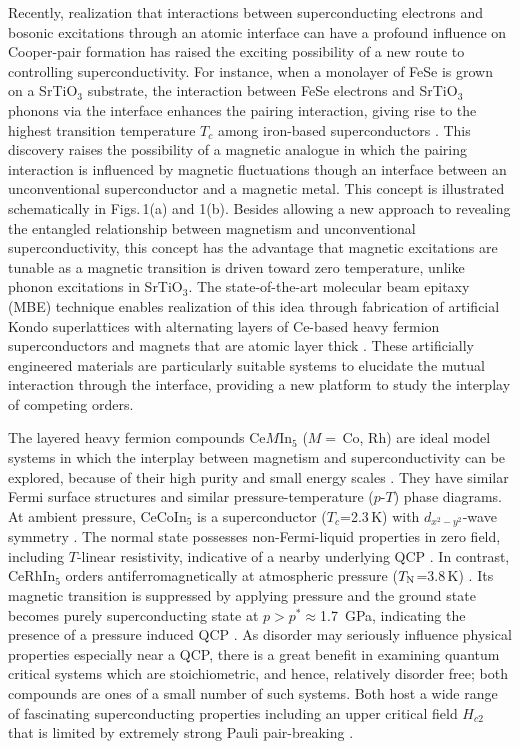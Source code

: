 \documentclass[twocolumn,preprintnumbers,amsmath,amssymb,prl]{revtex4}
\begin{document}
Recently, realization that interactions between superconducting electrons and bosonic excitations through an atomic interface can have a profound influence on Cooper-pair formation has raised the exciting possibility of a new route to controlling superconductivity.   For instance, when a monolayer of FeSe is grown on a SrTiO$_3$ substrate, the interaction between FeSe electrons and SrTiO$_3$ phonons via the interface enhances the pairing interaction, giving rise to the highest  transition temperature $T_c$ among iron-based superconductors \cite{Huang,DHLee,JJLee,Rademaker}.    This discovery raises the possibility of a magnetic analogue in which the pairing interaction is influenced by magnetic fluctuations though an interface between  an unconventional superconductor and a magnetic metal. This concept is illustrated schematically in Figs.\,1(a) and 1(b). Besides allowing a new approach to revealing the entangled relationship between magnetism and unconventional superconductivity, this concept has the  advantage that magnetic excitations are tunable as a magnetic transition is driven toward zero temperature, unlike phonon excitations in SrTiO$_3$.  The state-of-the-art molecular beam epitaxy (MBE) technique enables realization of this idea through fabrication of  artificial Kondo superlattices with alternating layers of Ce-based heavy fermion superconductors and magnets  that are atomic layer thick \cite{Shishido2010,Mizukami,Shimozawa2016}.  These artificially engineered materials are particularly suitable systems to elucidate the mutual interaction through the interface, providing a new platform to study the interplay of competing orders.  
 
The layered heavy fermion compounds Ce$M$In$_5$ ($M=$\,Co, Rh) are ideal model systems in which the interplay between magnetism and superconductivity can be explored, because of their high purity and small energy scales \cite{Thompson,Kenzelman,Knebel2010}.  They  have similar Fermi surface structures and similar pressure-temperature ($p$-$T$) phase diagrams.    At ambient pressure, CeCoIn$_5$ is a superconductor ($T_c$=2.3\,K) with $d_{x^2-y^2}$-wave symmetry \cite{Izawa,Allan,Zhou}. The normal state possesses non-Fermi-liquid properties in zero field, including $T$-linear resistivity, indicative of a nearby underlying QCP \cite{Sidorov,Nakajima}.  In contrast, CeRhIn$_5$ orders antiferromagnetically at atmospheric pressure ($T_{\rm N}$=3.8\,K) \cite{Bao}.  Its magnetic transition is suppressed by applying pressure and the ground state becomes purely superconducting state at $p>p^\ast\approx$1.7\, GPa, indicating the presence of a pressure induced QCP \cite{Park2006,Knebel2008,Park2008,Shishido2005}.   As disorder may seriously influence physical properties especially near a QCP, there is a great benefit in examining quantum critical systems which are stoichiometric, and hence, relatively disorder free; both compounds are ones of a small number of such systems. Both host a wide range of fascinating superconducting properties including an upper critical field $H_{c2}$ that is limited by  extremely strong Pauli pair-breaking \cite{Izawa,Knebel2008}. 
\end{document}
